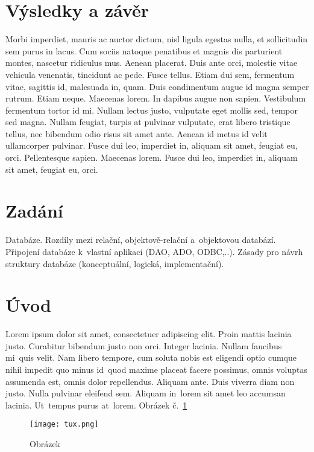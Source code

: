 \section{Výsledky a závěr}
Morbi imperdiet, mauris ac auctor dictum, nisl ligula egestas nulla, et sollicitudin sem purus in lacus. Cum sociis natoque penatibus et magnis dis parturient montes, nascetur ridiculus mus. Aenean placerat. Duis ante orci, molestie vitae vehicula venenatis, tincidunt ac pede. Fusce tellus. Etiam dui sem, fermentum vitae, sagittis id, malesuada in, quam. Duis condimentum augue id magna semper rutrum. Etiam neque. Maecenas lorem. In dapibus augue non sapien. Vestibulum fermentum tortor id mi. Nullam lectus justo, vulputate eget mollis sed, tempor sed magna. Nullam feugiat, turpis at pulvinar vulputate, erat libero tristique tellus, nec bibendum odio risus sit amet ante. Aenean id metus id velit ullamcorper pulvinar. Fusce dui leo, imperdiet in, aliquam sit amet, feugiat eu, orci. Pellentesque sapien. Maecenas lorem. Fusce dui leo, imperdiet in, aliquam sit amet, feugiat eu, orci.
\section*{Zadání}
Databáze. Rozdíly mezi relační, objektově-relační a~objektovou databází. Připojení databáze k vlastní aplikaci (DAO, ADO, ODBC,..). Zásady pro návrh struktury databáze (konceptuální, logická, implementační).

\section{Úvod}
Lorem ipsum dolor sit amet, consectetuer adipiscing elit. Proin mattis lacinia justo. Curabitur bibendum justo non orci. Integer lacinia. Nullam faucibus mi~quis velit. Nam libero tempore, cum soluta nobis est eligendi optio cumque nihil impedit quo minus id~quod maxime placeat facere possimus, omnis voluptas assumenda est, omnis dolor repellendus. Aliquam ante. Duis viverra diam non justo. Nulla pulvinar eleifend sem. Aliquam in~lorem sit amet leo accumsan lacinia. Ut~tempus purus at~lorem. Obrázek č.~\ref{fig:tux}

\begin{figure}[htbp]
  \centering
  \texttt{[image: tux.png]}
  \caption{Obrázek}
  \label{fig:tux}
\end{figure}

